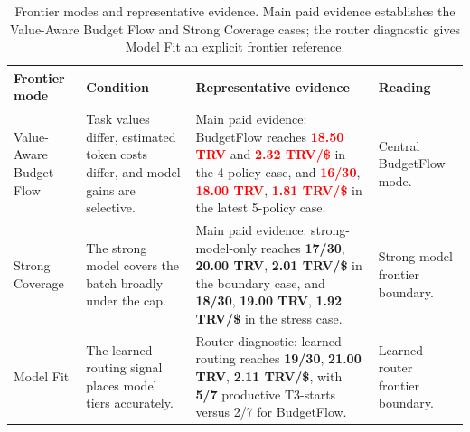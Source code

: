 \documentclass[sigconf,review,anonymous]{acmart}
\newcommand{\method}{BudgetFlow\xspace}
\newcommand{\trv}{TRV\xspace}
\newcommand{\pos}[1]{\textcolor{red}{\textbf{#1}}}
\newcommand{\ctrl}[1]{\textcolor{bfblue}{\textbf{#1}}}
\begin{document}
\begin{table}[t]
\centering
\footnotesize
\begin{tabular}{@{}p{}p{}p{}p{}@{}}
\toprule
Frontier mode & Condition & Representative evidence & Reading \\
\midrule
Value-Aware Budget Flow & Task values differ, estimated token costs differ, and model gains are selective. & Main paid evidence: \method reaches \pos{18.50 \trv} and \pos{2.32 \trv/\$} in the 4-policy case, and \pos{16/30}, \pos{18.00 \trv}, \pos{1.81 \trv/\$} in the latest 5-policy case. & Central \method mode. \\
Strong Coverage & The strong model covers the batch broadly under the cap. & Main paid evidence: strong-model-only reaches \ctrl{17/30}, \ctrl{20.00 \trv}, \ctrl{2.01 \trv/\$} in the boundary case, and \ctrl{18/30}, \ctrl{19.00 \trv}, \ctrl{1.92 \trv/\$} in the stress case. & Strong-model frontier boundary. \\
Model Fit & The learned routing signal places model tiers accurately. & Router diagnostic: learned routing reaches \ctrl{19/30}, \ctrl{21.00 \trv}, \ctrl{2.11 \trv/\$}, with \ctrl{5/7} productive T3-starts versus 2/7 for \method. & Learned-router frontier boundary. \\
\bottomrule
\end{tabular}
\caption{Frontier modes and representative evidence. Main paid evidence establishes the Value-Aware Budget Flow and Strong Coverage cases; the router diagnostic gives Model Fit an explicit frontier reference.}
\label{tab:frontier-modes}
\end{table}
\end{document}
